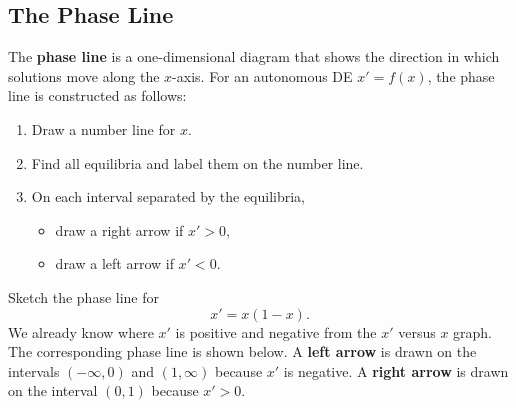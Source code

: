\documentclass[10pt,letterpaper]{article}
\begin{document}
\subsection{The Phase Line}

The \textbf{phase line} is a one-dimensional diagram that shows the
direction in which solutions move along the $x$-axis. For an autonomous DE $x'=f(x)$, the phase line is constructed as follows:
\begin{enumerate}
    \item Draw a number line for $x$.
    \item Find all equilibria and label them on the number line.
    \item On each interval separated by the equilibria,
    \begin{itemize}
        \item draw a right arrow if $x'>0$,
        \item draw a left arrow if $x'<0$.
    \end{itemize}
\end{enumerate}

\begin{example}[4]{
Sketch the phase line for
\[
    x'=x(1-x).
\]
}
We already know where $x'$ is positive and negative from the $x'$ versus
$x$ graph. The corresponding phase line is shown below. A \textbf{left arrow} is drawn on the intervals $(-\infty,0)$ and $(1,\infty)$ because $x'$ is negative. A \textbf{right arrow} is drawn on the interval $(0,1)$ because $x'>0$. 
\begin{figure}[H]
    \centering
{}
\end{figure}

\end{example}
\end{document}
